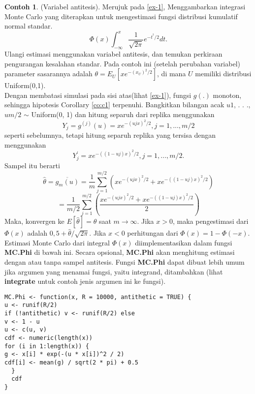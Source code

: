 \documentclass[a4paper,12pt]{article}
\theoremstyle{definition}
\newtheorem{example}{Contoh}[section]
\begin{document}
 \begin{example}
(Variabel antitesis). Merujuk pada \cref{ex-1}, Menggambarkan integrasi Monte Carlo yang diterapkan untuk mengestimasi fungsi distribusi kumulatif normal standar. 
 \begin{equation*}
             \Phi (x)\int_{-\infty }^{x}\frac{1}{\sqrt{2\pi }}e^{-t^{^2}/2}dt.
 \end{equation*}
 Ulangi estimasi menggunakan variabel antitesis, dan temukan perkiraan pengurangan kesalahan standar. Pada contoh ini (setelah perubahan variabel) parameter sasarannya adalah $\theta = E_{U}[xe^{-(x_{U})^2/2}]$, di mana $U$ memiliki distribusi Uniform(0,1).\\
 Dengan membatasi simulasi pada sisi atas(lihat \cref{ex-1}), fungsi $g(.)$ monoton, sehingga hipotesis Corollary \ref{co:c1} terpenuhi. Bangkitkan bilangan acak $u1$, . . ., $um/2$ $\sim$ Uniform(0, 1) dan hitung separuh dari replika menggunakan
 \begin{equation}
     Y_{j}=g^{(j)}(u)=xe^{-(ujx)^2/2},j=1,. . .,m/2
 \end{equation}
 seperti sebelumnya, tetapi hitung separuh replika yang tersisa dengan menggunakan
 \begin{equation}
     Y_{j}^{{}'}=xe^{-((1-uj)x)^2/2},j=1,. . .,m/2.
 \end{equation}
 Sampel itu berarti
 \begin{equation}
     \hat{\theta}=\overline{g_{m}(u)}=\frac{1}{m}\sum_{j=1}^{m/2}\left ( xe^{-(ujx)^2/2} + xe^{-((1-uj)x)^2/2} \right )
 \end{equation}
 \begin{equation*}
     =\frac{1}{m/2}\sum_{j=1}^{m/2}\left ( \frac{xe^{-(ujx)^2/2} + xe^{-((1-uj)x)^2/2}}{2} \right )
 \end{equation*}
 Maka, konvergen ke $E[\hat{\theta}]=\theta$ saat $m\rightarrow \infty$. Jika $x>0$, maka pengestimasi dari $\Phi (x)$ adalah $0,5+\hat{\theta}/\sqrt{2\pi }$. Jika $x<0$ perhitungan dari $\Phi (x)=1-\Phi(-x)$. Estimasi Monte Carlo dari integral  $\Phi (x)$ diimplementasikan dalam fungsi \textbf{MC.Phi} di bawah ini. Secara opsional, \textbf{MC.Phi} akan menghitung estimasi dengan atau tanpa sampel antitesis. Fungsi \textbf{MC.Phi} dapat dibuat lebih umum jika argumen yang menamai fungsi, yaitu integrand, ditambahkan (lihat \textbf{integrate} untuk contoh jenis argumen ini ke fungsi).
 \end{example}
\begin{lstlisting}
MC.Phi <- function(x, R = 10000, antithetic = TRUE) {
u <- runif(R/2)
if (!antithetic) v <- runif(R/2) else
v <- 1 - u
u <- c(u, v)
cdf <- numeric(length(x))
for (i in 1:length(x)) {
g <- x[i] * exp(-(u * x[i])^2 / 2)
cdf[i] <- mean(g) / sqrt(2 * pi) + 0.5
  }
  cdf
}
\end{lstlisting}
\end{document}
